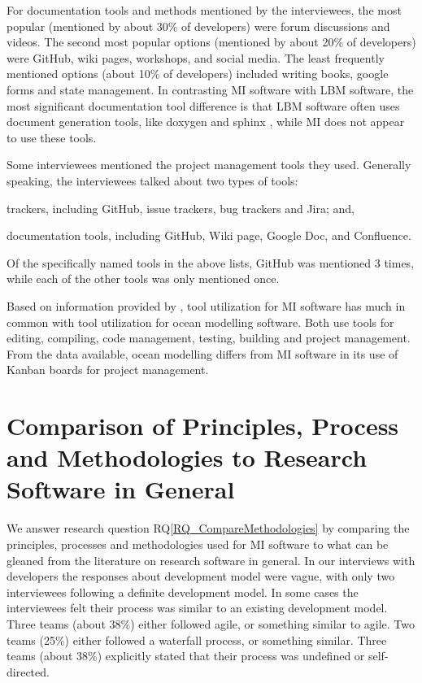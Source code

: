 \documentclass[final, 3p, times, authoryear]{elsarticle}
\newcommand{\rqref}[1]{RQ\ref{#1}}
\begin{document}
For documentation tools and methods mentioned by the interviewees, the most
popular (mentioned by about 30\% of developers) were forum discussions and
videos.  The second most popular options (mentioned by about 20\% of developers)
were GitHub, wiki pages, workshops, and social media. The least frequently
mentioned options (about 10\% of developers) included writing books, google
forms and state management.  In contrasting MI software with LBM software, the
most significant documentation tool difference is that LBM software often uses
document generation tools, like doxygen and sphinx \citep{Michalski2021}, while
MI does not appear to use these tools. 

Some interviewees mentioned the project management tools they used. Generally
speaking, the interviewees talked about two types of tools:
\begin{inparaenum}[i)]
\item trackers, including GitHub, issue trackers, bug trackers and Jira; and,
\item documentation tools, including GitHub, Wiki page, Google Doc, and
Confluence.
\end{inparaenum}
Of the specifically named tools in the above lists, GitHub was mentioned 3
times, while each of the other tools was only mentioned once.

Based on information provided by \citet{JungEtAl2022}, tool utilization for MI
software has much in common with tool utilization for ocean modelling software.
Both use tools for editing, compiling, code management, testing, building and
project management.  From the data available, ocean modelling differs from MI
software in its use of Kanban boards for project management.

\section{Comparison of Principles, Process and Methodologies to Research Software in General} \label{Sec_CompareMethodologies}

We answer research question \rqref{RQ_CompareMethodologies} by comparing the
principles, processes and methodologies used for MI software to what can be
gleaned from the literature on research software in general. In our interviews
with developers the responses about development model were vague, with only two
interviewees following a definite development model. In some cases the
interviewees felt their process was similar to an existing development model.
Three teams (about 38\%) either followed agile, or something similar to agile.
Two teams (25\%) either followed a waterfall process, or something similar.
Three teams (about 38\%) explicitly stated that their process was undefined or
self-directed.
\end{document}
